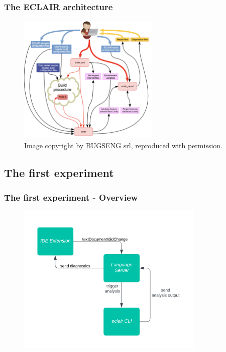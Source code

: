 \documentclass[compress,xcolor={dvipsnames}]{beamer}
\begin{document}
\begin{frame}
  \frametitle{The ECLAIR architecture}
  \large

  \begin{figure}[ht]
    \centering
    \includegraphics[width=0.6\textwidth]{./ECLAIR_basic_qualifiable_architecture.png}
    \caption{Image copyright by BUGSENG srl, reproduced with permission.}
    \label{fig:one}
  \end{figure}
\end{frame}

\subsection{The first experiment}

\begin{frame}
  \frametitle{The first experiment - Overview}
  \large

  \begin{figure}[ht]
    \centering
    \includegraphics[width=0.8\textwidth]{./the_first_experiment_flow.jpg}
    \label{fig:one}
  \end{figure}
\end{frame}
\end{document}

